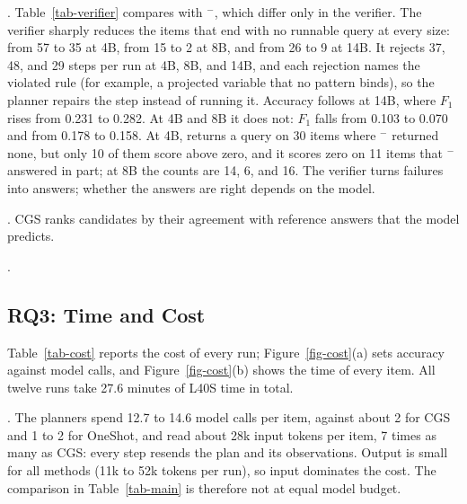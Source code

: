 .
Table~\ref{tab-verifier} compares \hermes with \hermes{}$^-$, which
differ only in the verifier.
The verifier sharply reduces the items that end with no runnable query
at every size: from 57 to 35 at 4B, from 15 to 2 at 8B, and from 26 to
9 at 14B.
It rejects 37, 48, and 29 steps per run at 4B, 8B, and 14B, and each
rejection names the violated rule (for example, a projected variable
that no pattern binds), so the planner repairs the step instead of
running it.
Accuracy follows at 14B, where $F_1$ rises from 0.231 to 0.282.
At 4B and 8B it does not: $F_1$ falls from 0.103 to 0.070 and from
0.178 to 0.158.
At 4B, \hermes returns a query on 30 items where \hermes{}$^-$ returned
none, but only 10 of them score above zero, and it scores zero on 11
items that \hermes{}$^-$ answered in part; at 8B the counts are 14, 6,
and 16.
The verifier turns failures into answers; whether the answers are
right depends on the model.

\begin{table}[t]
  \caption{The verifier: \hermes against \hermes{}$^-$ on CK26. No
    answer counts items that end without a runnable query; Steps is the
    mean number of actions per item.}
  \label{tab-verifier}
  \footnotesize
  \setlength{\tabcolsep}{3.5pt}
  
\end{table}

.
CGS ranks candidates by their agreement with reference answers that the
model predicts.

.

\subsection{RQ3: Time and Cost}
\label{sec-exp-rq3}

Table~\ref{tab-cost} reports the cost of every run; Figure~\ref{fig-cost}(a)
sets accuracy against model calls, and Figure~\ref{fig-cost}(b) shows
the time of every item.
All twelve runs take 27.6 minutes of L40S time in total.

.
The planners spend 12.7 to 14.6 model calls per item, against about 2
for CGS and 1 to 2 for OneShot, and read about 28k input tokens per
item, 7 times as many as CGS: every step resends the plan and its
observations.
Output is small for all methods (11k to 52k tokens per run), so input
dominates the cost.
The comparison in Table~\ref{tab-main} is therefore not at equal model
budget.

